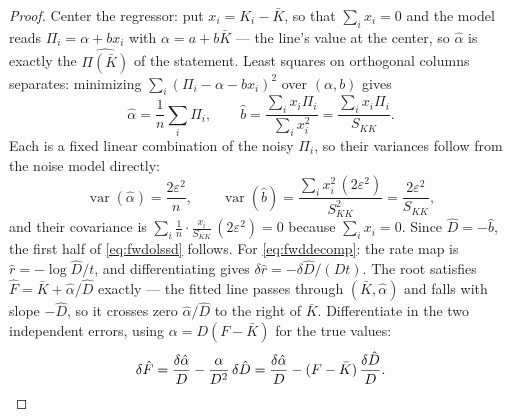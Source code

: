 \begin{proof}
Center the regressor: put $x_i=K_i-\bar K$, so that $\sum_ix_i=0$ and
the model reads $\Pi_i=\alpha+bx_i$ with $\alpha=a+b\bar K$ --- the
line's value at the center, so $\hat\alpha$ is exactly the
$\widehat{\Pi(\bar K)}$ of the statement.  Least squares on orthogonal columns
separates: minimizing $\sum_i(\Pi_i-\alpha-bx_i)^2$ over $(\alpha,b)$
gives
\[
\hat\alpha=\frac1n\sum_i\Pi_i,
\qquad
\hat b=\frac{\sum_ix_i\Pi_i}{\sum_ix_i^2}
=\frac{\sum_ix_i\Pi_i}{S_{KK}} .
\]
Each is a fixed linear combination of the noisy $\Pi_i$, so their
variances follow from the noise model directly:
\[
\operatorname{var}(\hat\alpha)=\frac{2\varepsilon^2}{n},
\qquad
\operatorname{var}(\hat b)
=\frac{\sum_ix_i^2\,(2\varepsilon^2)}{S_{KK}^2}
=\frac{2\varepsilon^2}{S_{KK}},
\]
and their covariance is
$\sum_i\frac1n\cdot\frac{x_i}{S_{KK}}\,(2\varepsilon^2)=0$ because
$\sum_ix_i=0$.  Since $\hat D=-\hat b$, the first half of
\eqref{eq:fwdolssd} follows.  For \eqref{eq:fwddecomp}: the rate map
is $\hat r=-\log\hat D/t$, and differentiating gives
$\delta\hat r=-\delta\hat D/(D t)$.  The root satisfies
$\hat F=\bar K+\hat\alpha/\hat D$ exactly --- the fitted line passes
through $(\bar K,\hat\alpha)$ and falls with slope $-\hat D$, so it
crosses zero $\hat\alpha/\hat D$ to the right of $\bar K$.
Differentiate in the two independent errors, using
$\alpha=D(F-\bar K)$ for the true values:
\[
\delta\hat F
=\frac{\delta\hat\alpha}{D}
-\frac{\alpha}{D^2}\,\delta\hat D
=\frac{\delta\hat\alpha}{D}
-(F-\bar K)\,\frac{\delta\hat D}{D}. \qedhere
\]
\end{proof}

